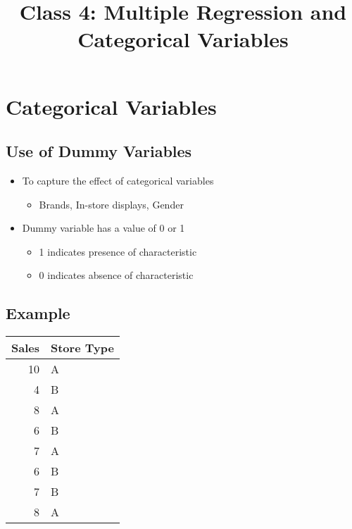 \documentclass[10pt,article]{article}
\date{\vspace{-6ex}}
\title{Class 4: Multiple Regression and Categorical Variables}
\begin{document}
\maketitle
{} 
\thispagestyle{fancy}

\setcounter{tocdepth}{1}
\tableofcontents
\vspace{6ex}

\section{Categorical Variables}
\label{sec:org52edf69}
\subsection{Use of Dummy Variables}
\label{sec:org48fd3bf}
\begin{itemize}
\item To capture the effect of categorical variables
\begin{itemize}
\item Brands, In-store displays, Gender
\end{itemize}

\item Dummy variable has a value of 0 or 1
\begin{itemize}
\item 1 indicates presence of characteristic
\item 0 indicates absence of characteristic
\end{itemize}
\end{itemize}
\subsection{Example}
\label{sec:org5e1e7b9}

{\small
\begin{center}
\begin{tabular}{rl}
Sales & Store Type\\
\hline
10 & A\\
4 & B\\
8 & A\\
6 & B\\
7 & A\\
6 & B\\
7 & B\\
8 & A\\
\end{tabular}
\end{center}
}
\end{document}
